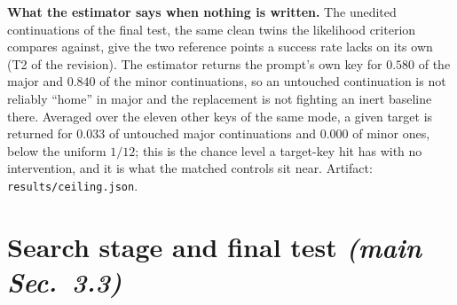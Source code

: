 \documentclass{article}
\begin{document}
\textbf{What the estimator says when nothing is written.} The unedited continuations
of the final test, the same clean twins the likelihood criterion compares against, give
the two reference points a success rate lacks on its own (T2 of the revision). The
estimator returns the prompt's own key for $0.580$ of the major and $0.840$ of the minor
continuations, so an untouched continuation is not reliably ``home'' in major and the
replacement is not fighting an inert baseline there. Averaged over the eleven other keys
of the same mode, a given target is returned for $0.033$ of untouched major continuations
and $0.000$ of minor ones, below the uniform $1/12$; this is the chance level a
target-key hit has with no intervention, and it is what the matched controls sit near.
Artifact: \texttt{results/ceiling.json}.

\section{Search stage and final test \normalfont\textit{(main Sec.~3.3)}}
\end{document}
